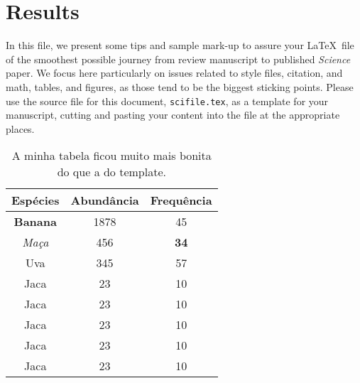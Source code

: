 
\section*{Results}

In this file, we present some tips and sample mark-up to assure your
\LaTeX\ file of the smoothest possible journey from review manuscript
to published {\it Science\/} paper.  We focus here particularly on
issues related to style files, citation, and math, tables, and
figures, as those tend to be the biggest sticking points.  Please use
the source file for this document, \texttt{scifile.tex}, as a template
for your manuscript, cutting and pasting your content into the file at
the appropriate places. 

\begin{table}[h]
	\centering
	\caption{A minha tabela ficou muito mais bonita do que a do template.} 
	\label{tab1}
	\begin{tabular}{ccc}
		\hline \rule[-2ex]{0pt}{5.5ex} Espécies & Abundância & Frequência \\ 
		\hline \rule[-2ex]{0pt}{5.5ex} \textbf{Banana} & 1878 & 45 \\ 
		\hline \rule[-2ex]{0pt}{5.5ex} \textit{Maça} & 456 & \textbf{34} \\ 
		\hline \rule[-2ex]{0pt}{5.5ex} Uva & 345 & 57 \\ 
		\hline \rule[-2ex]{0pt}{5.5ex} Jaca & 23 & 10 \\ 
		\hline \rule[-2ex]{0pt}{5.5ex} Jaca & 23 & 10 \\ 
		\hline \rule[-2ex]{0pt}{5.5ex} Jaca & 23 & 10 \\ 
		\hline \rule[-2ex]{0pt}{5.5ex} Jaca & 23 & 10 \\ 
		\hline \rule[-2ex]{0pt}{5.5ex} Jaca & 23 & 10 \\ 
		\hline 
	\end{tabular}
\end{table}
